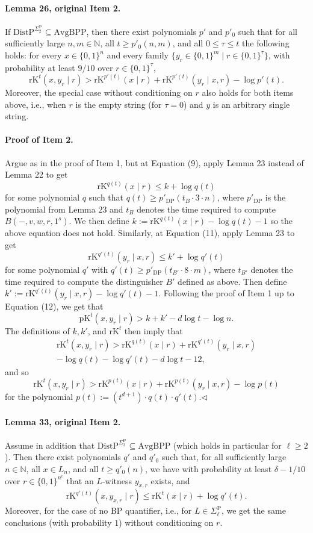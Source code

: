 \documentclass[10pt,a4paper]{article}
\begin{document}
\paragraph{Lemma 26, original Item 2.} If $\mathrm{DistP}^{\Sigma_2^{\mathrm P}}\subseteq\mathrm{AvgBPP}$, then there exist polynomials $p'$ and $p'_0$ such that for all sufficiently large $n,m\in\mathbb N$, all $t\geq p'_0(n,m)$, and all $0\leq\tau\leq t$ the following holds: for every $x\in\{0,1\}^n$ and every family $\{y_r\in\{0,1\}^m\mid r\in\{0,1\}^\tau\}$, with probability at least $9/10$ over $r\in\{0,1\}^\tau$,
\[\mathrm{rK}^t(x,y_r\mid r)>\mathrm{rK}^{p'(t)}(x\mid r)+\mathrm{rK}^{p'(t)}(y_r\mid x,r)-\log p'(t).\]
Moreover, the special case without conditioning on $r$ also holds for both items above, i.e., when $r$ is the empty string (for $\tau=0$) and $y$ is an arbitrary single string.
\paragraph{Proof of Item 2.} Argue as in the proof of Item 1, but at Equation (9), apply Lemma 23 instead of Lemma 22 to get
\[\mathrm{rK}^{q(t)}(x\mid r)\leq k+\log q(t)\]
for some polynomial $q$ such that $q(t)\geq p'_{\mathrm{DP}}(t_B\cdot3\cdot n)$, where $p'_{\mathrm{DP}}$ is the polynomial from Lemma 23 and $t_B$ denotes the time required to compute $B(-,v,w,r,1^s)$. We then define $k:=\mathrm{rK}^{q(t)}(x\mid r)-\log q(t)-1$ so the above equation does not hold. Similarly, at Equation (11), apply Lemma 23 to get
\[\mathrm{rK}^{q'(t)}(y_r\mid x,r)\leq k'+\log q'(t)\]
for some polynomial $q'$ with $q'(t)\geq p'_{\mathrm{DP}}(t_{B'}\cdot8\cdot m)$, where $t_{B'}$ denotes the time required to compute the distinguisher $B'$ defined as above. Then define $k':=\mathrm{rK}^{q'(t)}(y_r\mid x,r)-\log q'(t)-1$.
Following the proof of Item 1 up to Equation (12), we get that
\[\mathrm{pK}^t(x,y_r\mid r)>k+k'-d\log t-\log n.\]
The definitions of $k,k'$, and $\mathrm{rK}^t$ then imply that
\begin{multline*}
\mathrm{rK}^t(x,y_r\mid r)>\mathrm{rK}^{q(t)}(x\mid r)+\mathrm{rK}^{q'(t)}(y_r\mid x,r)\\
-\log q(t)-\log q'(t)-d\log t-12,
\end{multline*}
and so
\[\mathrm{rK}^t(x,y_r\mid r)>\mathrm{rK}^{p(t)}(x\mid r)+\mathrm{rK}^{p(t)}(y_r\mid x,r)-\log p(t)\]
for the polynomial $p(t):=(t^{d+1})\cdot q(t)\cdot q'(t)$.\hfill$\triangleleft$
\paragraph{Lemma 33, original Item 2.} Assume in addition that $\mathrm{DistP}^{\Sigma_2^{\mathrm P}}\subseteq\mathrm{AvgBPP}$ (which holds in particular for $\ell\geq2$). Then there exist polynomials $q'$ and $q'_0$ such that, for all sufficiently large $n\in\mathbb N$, all $x\in L_n$, and all $t\geq q'_0(n)$, we have with probability at least $\delta-1/10$ over $r\in\{0,1\}^{n^c}$ that an $L$-witness $y_{x,r}$ exists, and
\[\mathrm{rK}^{q'(t)}(x,y_{x,r}\mid r)\leq\mathrm{rK}^t(x\mid r)+\log q'(t).\]
Moreover, for the case of no BP quantifier, i.e., for $L\in\Sigma_\ell^{\mathrm P}$, we get the same conclusions (with probability $1$) without conditioning on $r$.
\end{document}
